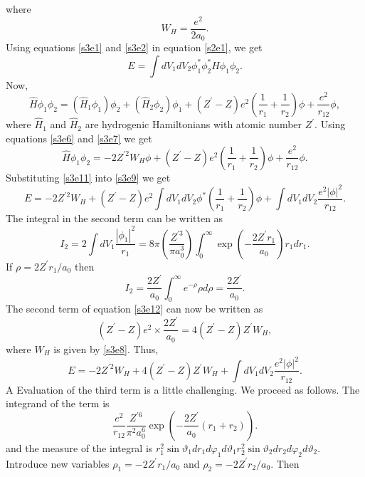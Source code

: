 \documentclass{article}
\numberwithin{equation}{section}
\begin{document}
where 
\begin{equation}\label{s3e8}
W_H = \frac{e^2}{2a_0}.
\end{equation}
Using equations \eqref{s3e1} and \eqref{s3e2} in equation \eqref{s2e1}, we get
\begin{equation}\label{s3e9}
E = \int dV_1 dV_2 \phi_1^\ast\phi_2^\ast\hat{H}\phi_1\phi_2.
\end{equation}
Now, 
\begin{equation}\label{s3e10}
\hat{H}\phi_1\phi_2 = (\hat{H}_1\phi_1)\phi_2 + (\hat{H}_2\phi_2)\phi_1 + (Z^\prime - Z)e^2\left(\frac{1}{r_1} + \frac{1}{r_2}\right)\phi + \frac{e^2}{r_{12}}\phi,
\end{equation}
where $\hat{H}_1$ and $\hat{H}_2$ are hydrogenic Hamiltonians with atomic number
$Z^\prime$. Using equations \eqref{s3e6} and \eqref{s3e7} we get
\begin{equation}\label{s3e11}
\hat{H}\phi_1\phi_2 = -2Z^{\prime 2}W_H\phi + (Z^\prime - Z)e^2\left(\frac{1}{r_1} + \frac{1}{r_2}\right)\phi + \frac{e^2}{r_{12}}\phi.
\end{equation}
Substituting \eqref{s3e11} into \eqref{s3e9} we get
\begin{equation}\label{s3e12}
E = -2Z^{\prime 2}W_H + (Z^\prime - Z)e^2\int dV_1dV_2\phi^\ast\left(\frac{1}{r_1} + \frac{1}{r_2}\right)\phi + \int dV_1dV_2\frac{e^2|\phi|^2}{r_{12}}.
\end{equation}
The integral in the second term can be written as
\[
I_2 = 2\int dV_1\frac{|\phi_1|^2}{r_1} = 8\pi\left(\frac{Z^{\prime 3}}{\pi a_0^3}\right)\int_0^\infty\exp\left(-\frac{2Z^\prime r_1}{a_0}\right)r_1 dr_1.
\]
If $\rho = 2Z^\prime r_1/a_0$ then
\[
I_2 = \frac{2Z^\prime}{a_0}\int_0^\infty e^{-\rho}\rho d\rho = \frac{2Z^\prime}{a_0}.
\]
The second term of equation \eqref{s3e12} can now be written as
\[
(Z^\prime - Z)e^2 \times \frac{2Z^\prime}{a_0} = 4(Z^\prime - Z)Z^\prime W_H,
\]
where $W_H$ is given by \eqref{s3e8}. Thus,
\begin{equation}\label{s3e13}
E = -2Z^{\prime 2}{W_H} + 4(Z^\prime - Z)Z^\prime W_H +  \int dV_1dV_2\frac{e^2|\phi|^2}{r_{12}}.
\end{equation}A
Evaluation of the third term is a little challenging. We proceed as follows. 
The integrand of the term is
\[
\frac{e^2}{r_{12}}\frac{Z^{\prime 6}}{\pi^2 a_0^6}\exp\left(-\frac{2Z^\prime}{a_0}(r_1 + r_2)\right).
\]
and the measure of the integral is $r_1^2\sin\vartheta_1dr_1d\varphi_1 d\vartheta_1 r_2^2\sin\vartheta_2dr_2d\varphi_2 d\vartheta_2$.
Introduce new variables $\rho_1 = -2Z^\prime r_1/a_0$ and $\rho_2 = -2Z^\prime r_2/a_0$. Then
\end{document}
